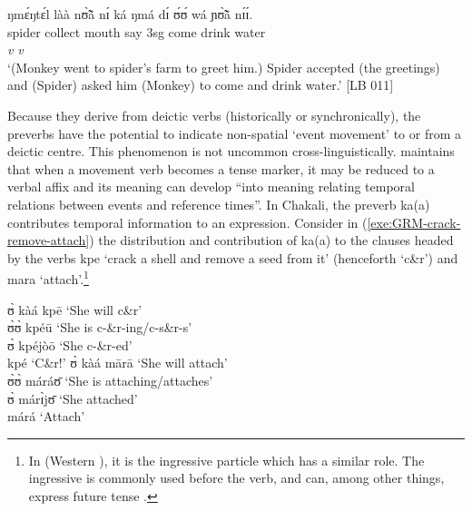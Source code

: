 \begin{exe}
\begin{exe}
\begin{exe}
\begin{exe}
\begin{exe}
\begin{exe}
\begin{exe}
\begin{exe}
\begin{exe}
\begin{exe}
\begin{exe}
\ex\label{GRM-prev-SVC-wa}
\glll ŋmɛ́ŋtɛ́l   làà nʊ̃̀ã̀  nɪ́ ká  ŋmá dɪ́ ʊ́ʊ́  wá ɲʊ̃̀ã̀ nɪ́ɪ́.\\
spider collect mouth {\postp}  {\conn} say {\comp}  
{\sc 3sg}  come   drink water\\
 {} {} {} {} {}  {} {} {} {\it v} {\it v} {}\\
\glt  `(Monkey went to spider's farm to greet him.)  Spider accepted
(the
greetings) and (Spider) asked him (Monkey) to come and drink water.'  [LB 011]

 
\z 
 \z

Because they derive from deictic verbs (historically or synchronically),  the preverbs have the potential to indicate non-spatial  `event movement'  to or from a deictic centre. This phenomenon is not uncommon cross-linguistically. \citet[62]{Nico07} maintains  that when a movement verb becomes a tense marker, it may be reduced to a verbal affix and its meaning can develop ``into meaning relating temporal relations between events and reference times''. In Chakali, the  preverb {\sls ka(a)} contributes  temporal information to an expression. Consider in (\ref{exe:GRM-crack-remove-attach}) the distribution and contribution of  {\sls ka(a)} to  the clauses headed by the verbs {\sls kpe} `crack a shell and remove a seed from it' (henceforth `c\&r') and {\sls mara} `attach'.\footnote{In  (Western ), it is the ingressive particle which has a similar role. The ingressive  is commonly used before the verb, and can, among other things,  express future tense \citep[see][59]{Daku07b}.}



\ea\label{exe:GRM-crack-remove-attach}

\ea

 ʊ̀ kàá kpē  {\rm  `She will c\&r'}\\
   ʊ̀ʊ̀ kpéū  {\rm  `She  is c-\&r-ing/c-s\&r-s'}\\
   ʊ̀ kpéjòō   {\rm `She   c-\&r-ed'}\\
   kpé    {\rm  `C\&r!'}
\ex
 ʊ̀ kàá mārā   {\rm   `She will attach'}\\
   ʊ̀ʊ̀ máráʊ̄  {\rm  `She  is attaching/attaches'}\\
  ʊ̀ márɪ̀jʊ̄ {\rm `She   attached'}\\
   márá  {\rm  `Attach'}

\z
\z


\end{exe}
\end{exe}
\end{exe}
\end{exe}
\end{exe}
\end{exe}
\end{exe}
\end{exe}
\end{exe}
\end{exe}
\end{exe}
